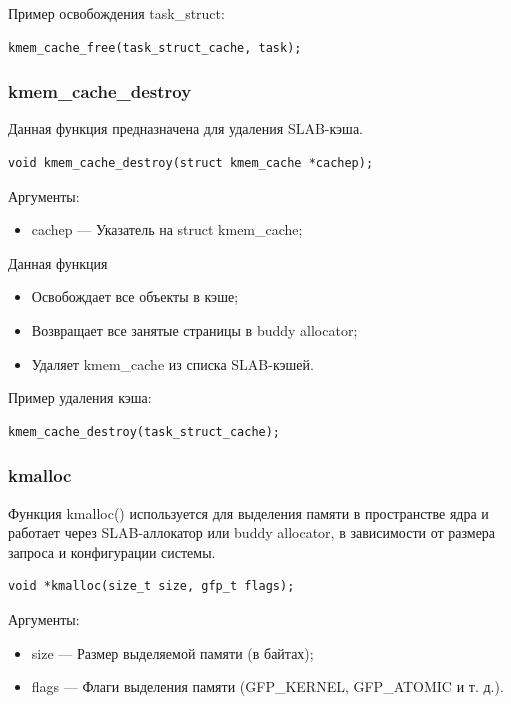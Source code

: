 Пример освобождения task\_struct:

\begin{lstlisting}
kmem_cache_free(task_struct_cache, task);
\end{lstlisting}

\subsubsection*{kmem\_cache\_destroy}

Данная функция предназначена для удаления SLAB-кэша.

\begin{lstlisting}
void kmem_cache_destroy(struct kmem_cache *cachep);
\end{lstlisting}

Аргументы:
\begin{itemize}
    \item cachep --- Указатель на struct kmem\_cache;
\end{itemize}

Данная функция
\begin{itemize}
    \item Освобождает все объекты в кэше;
    \item Возвращает все занятые страницы в buddy allocator;
    \item Удаляет kmem\_cache из списка SLAB-кэшей.
\end{itemize}

Пример удаления кэша:

\begin{lstlisting}
kmem_cache_destroy(task_struct_cache);
\end{lstlisting}

\subsubsection{kmalloc}

Функция kmalloc() используется для выделения памяти в пространстве ядра и работает через SLAB-аллокатор или buddy allocator, в зависимости от размера запроса и конфигурации системы.

\begin{lstlisting}
void *kmalloc(size_t size, gfp_t flags);
\end{lstlisting}

Аргументы:
\begin{itemize}
    \item size --- Размер выделяемой памяти (в байтах);
    \item flags --- Флаги выделения памяти (GFP\_KERNEL, GFP\_ATOMIC и т. д.).
\end{itemize}

